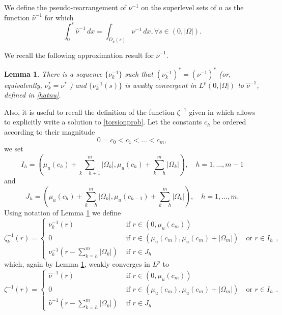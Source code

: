 \documentclass[oneside,a4paper,11pt,notitlepage]{article}
\newcommand{\abs}[1]{{\left|#1\right|}}
\theoremstyle{definition}
\theoremstyle{plain}
\newtheorem{lemma}[theorem]{Lemma}
\theoremstyle{definition}
\begin{document}
 We define the pseudo-rearrangement of $\nu^{-1}$ on the superlevel sets of $u$ as the function $\hat \nu^{-1}$ for which
\begin{equation}
    \label{hatnu}
    \int_0^s \hat \nu^{-1}\, dx = \int_{D_u(s)} \nu^{-1}\, dx, \forall s \in (0 , \abs{\Omega}).
\end{equation}

We recall the following  approximation result for $\hat\nu^{-1}$.
\begin{lemma}\label{approx}
    There is a sequence $\{\nu_k^{-1}\}$ such that $(\nu_k^{-1})^*=(\nu^{-1})^*$ (or, equivalently, $\nu_k^\ast=\nu^\ast$ ) and $\{\nu^{-1}_k(s)\}$ is weakly convergent in $L^p(0,\abs{\Omega})$ to $\displaystyle \hat\nu^{-1}$, defined in \eqref{hatnu}.
\end{lemma}
Also, it is useful to recall the definition of the function $\zeta^{-1}$ given in \cite{B} which allows to explicitly write a solution to \eqref{torsionprob}. Let the constants $c_h$ be ordered according to their magnitude
\[0=c_0<c_1<\dots< c_m,
\]
we set \[I_h=\left(\mu_u(c_h)+\sum_{k=h+1}^m\abs{\Omega_k},\mu_u(c_{h})+\sum_{k=h}^m\abs{\Omega_k}\right),\quad h=1,\dots,m-1\]
and 
\[ J_h=\left(\mu_u(c_h)+\sum_{k=h}^m\abs{\Omega_k},\mu_u(c_{h-1})+\sum_{k=h}^m\abs{\Omega_k}\right),\quad h=1,\dots,m.\]
Using notation of Lemma \ref{approx} we define
\begin{equation}
\label{zetak}\zeta^{-1}_k(r)=\begin{cases}
    \displaystyle{\nu_k^{-1}(r)} & \text{ if } r\in\left(0,\mu_u(c_m)\right)\\
    \displaystyle{0} & \text{ if } r\in\left(\mu_u(c_m),\mu_u(c_m)+|\Omega_m|\right) \quad \text{or }r\in I_h\\
    \displaystyle{\nu_k^{-1}\left(r-\sum_{k=h}^m\abs{\Omega_k}\right)} & \text{ if } r\in J_h
\end{cases}, \end{equation}
which, again by Lemma \ref{approx}, weakly converges in $L^p$ to
\begin{equation} \label{zeta}
    \zeta^{-1}(r)=\begin{cases}
    \displaystyle{\hat\nu^{-1}(r)} & \text{ if } r\in\left(0,\mu_u(c_m)\right)\\
    \displaystyle{0} & \text{ if } r\in\left(\mu_u(c_m),\mu_u(c_m)+|\Omega_m|\right)\quad \text{or }r\in I_h\\
    \displaystyle{\hat\nu^{-1}\left(r-\sum_{k=h}^m\abs{\Omega_k}\right)} & \text{ if } r\in J_h
\end{cases}.
\end{equation}
\end{document}
